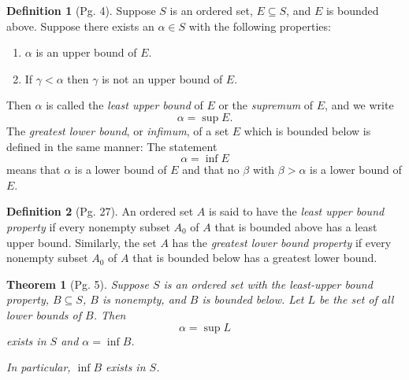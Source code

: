\documentclass[leqno]{article}
\newtheorem{theorem}{Theorem}[section]
\theoremstyle{definition}
\newtheorem{definition}{Definition}[section]
\theoremstyle{remark}
\begin{document}
        \begin{definition}[Pg. 4]\label{def:1.4}
            Suppose $S$ is an ordered set, $E\subseteq S$, and $E$ is bounded above. Suppose there exists an $\alpha\in S$ with the following properties:
                \begin{enumerate}[label=(\roman*)]
                    \item $\alpha$ is an upper bound of $E$.
                    \item If $\gamma<\alpha$ then $\gamma$ is not an upper bound of $E$.
                \end{enumerate}
            Then $\alpha$ is called the \emph{least upper bound} of $E$ or the \emph{supremum} of $E$, and we write
                \begin{equation*}
                    \alpha=\sup E.
                \end{equation*}
            The \emph{greatest lower bound}, or \emph{infimum}, of a set $E$ which is bounded below is defined in the same manner: The statement
                \begin{equation*}
                    \alpha=\inf E
                \end{equation*}
            means that $\alpha$ is a lower bound of $E$ and that no $\beta$ with $\beta>\alpha$ is a lower bound of $E$. \cite{rud}
        \end{definition}
        \begin{definition}[Pg. 27]\label{def:1.5}
            An ordered set $A$ is said to have the \emph{least upper bound property} if every nonempty subset $A_0$ of $A$ that is bounded above has a least upper bound. Similarly, the set $A$ has the \emph{greatest lower bound property} if every nonempty subset $A_0$ of $A$ that is bounded below has a greatest lower bound. \cite{mun}
        \end{definition}
        \begin{theorem}[Pg. 5]\label{thm:1.1}
            Suppose $S$ is an ordered set with the least-upper bound property, $B\subseteq S$, $B$ is nonempty, and $B$ is bounded below. Let $L$ be the set of all lower bounds of $B$. Then 
                \begin{equation*}
                    \alpha=\sup L
                \end{equation*}
            exists in $S$ and $\alpha=\inf B$. \par\hspace{4mm} In particular, $\inf B$ exists in $S$.  
        \end{theorem}
\end{document}
